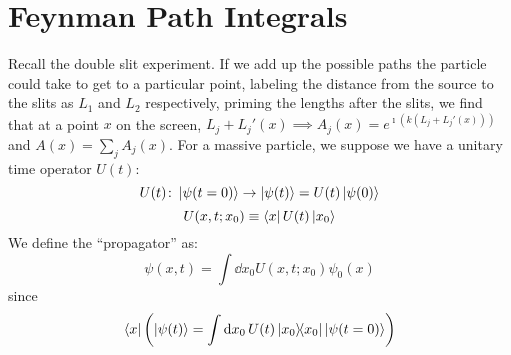 \documentclass[a4paper,twoside,master.tex]{subfiles}
\begin{document}
\section{Feynman Path Integrals}
\label{sec:feynman_path_integrals}

Recall the double slit experiment. If we add up the possible paths the particle could take to get to a particular point, labeling the distance from the source to the slits as $ L_1 $ and $ L_2 $ respectively, priming the lengths after the slits, we find that at a point $ x $ on the screen, $ L_j+L_j'(x) \implies A_j(x) = e^{\imath(k(L_j+L_j'(x)))} $ and $ A(x) = \sum_{j} A_j(x) $. For a massive particle, we suppose we have a unitary time operator $ U(t) $:
\begin{equation}
    U(t)\colon \ket{\psi(t = 0)} \to \ket{\psi(t)} = U(t) \ket{\psi(0)}
\end{equation}
\begin{equation}
    U(x,t;x_0) \equiv \bra{x} U(t) \ket{x_0}
\end{equation}
We define the ``propagator'' as:
\begin{equation}
    \psi(x,t) = \int \dd{x_0} U(x,t;x_0) \psi_0(x)
\end{equation}
since
\begin{equation}
    \bra{x} \left( \ket{\psi(t)} = \int \dd{x_0} U(t) \op{x_0} \ket{\psi(t=0)} \right)
\end{equation}
\end{document}
